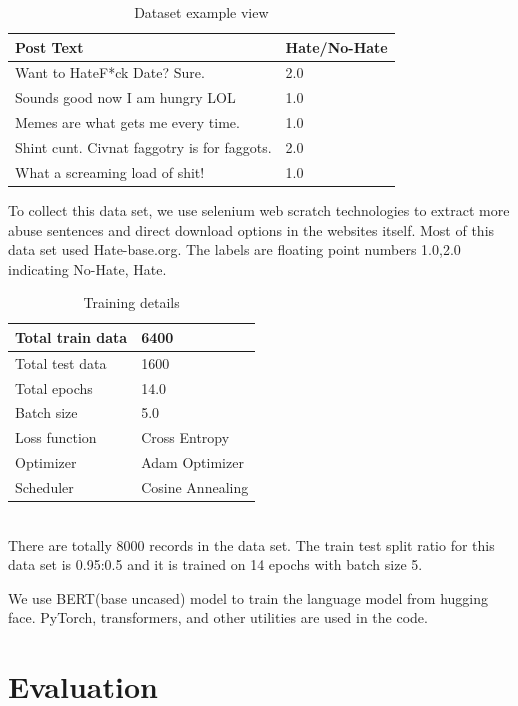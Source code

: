 \documentclass{article}
\begin{document}
\begin{table}[h]
\vline\vline
\begin{tabular}{|l|l|}
\hline
Post Text                                   & Hate/No-Hate \\ \hline
Want to HateF*ck Date? Sure.                & 2.0          \\ 
Sounds good now I am hungry LOL             & 1.0          \\ 
Memes are what gets me every time.          & 1.0          \\ 
Shint cunt. Civnat faggotry is for faggots. & 2.0          \\ 
What a screaming load of shit!              & 1.0          \\ 
\hline
\end{tabular}
\caption{Dataset example view}
\end{table}

To collect this data set, we use selenium web scratch technologies to extract more abuse sentences and direct download options in the websites itself. Most of this data set used Hate-base.org. The labels are floating point numbers 1.0,2.0 indicating No-Hate, Hate. 

\begin{table}[]
\vline\vline
\begin{tabular}{|l|l|}
\hline
Total train data & 6400             \\ \hline
Total test data  & 1600             \\ \hline
Total epochs     & 14.0             \\ \hline
Batch size       & 5.0              \\ \hline
Loss function    & Cross Entropy    \\ \hline
Optimizer        & Adam Optimizer   \\ \hline
Scheduler        & Cosine Annealing \\ \hline
\end{tabular}
\caption{Training details}
\end{table}\\

There are totally 8000 records in the data set. The train test split ratio for this data set is 0.95:0.5 and it is trained on 14 epochs with batch size 5.

We use BERT(base uncased) model to train the language model from hugging face. PyTorch, transformers, and other utilities are used in the code.
\section{Evaluation}
\end{document}
